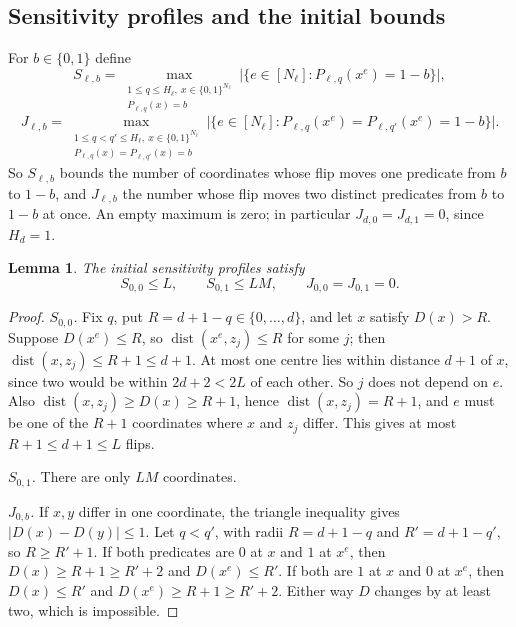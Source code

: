 \documentclass[11pt]{article}
\newtheorem{lemma}[theorem]{Lemma}
\theoremstyle{definition}
\theoremstyle{remark}
\begin{document}
\subsection{Sensitivity profiles and the initial bounds}
For \(b\in\{0,1\}\) define
\[
 S_{\ell,b}=\max_{\substack{1\le q\le H_\ell,\ x\in\{0,1\}^{N_\ell}\\
                           P_{\ell,q}(x)=b}}
 \bigl|\{e\in[N_\ell]:P_{\ell,q}(x^e)=1-b\}\bigr|,
\]
\[
 J_{\ell,b}=\max_{\substack{1\le q<q'\le H_\ell,\ x\in\{0,1\}^{N_\ell}\\
                         P_{\ell,q}(x)=P_{\ell,q'}(x)=b}}
 \bigl|\{e\in[N_\ell]:P_{\ell,q}(x^e)=P_{\ell,q'}(x^e)=1-b\}\bigr|.
\]
So $S_{\ell,b}$ bounds the number of coordinates whose flip moves one
predicate from $b$ to $1-b$, and $J_{\ell,b}$ the number whose flip moves two
distinct predicates from $b$ to $1-b$ at once. An empty maximum is zero; in
particular \(J_{d,0}=J_{d,1}=0\), since \(H_d=1\).

\begin{lemma}\label{lem:base}
The initial sensitivity profiles satisfy
\begin{equation}\label{eq:base-profile}
 S_{0,0}\le L,\qquad S_{0,1}\le LM,\qquad
 J_{0,0}=J_{0,1}=0.
\end{equation}
\end{lemma}
\begin{proof}
\emph{$S_{0,0}$.} Fix $q$, put \(R=d+1-q\in\{0,\ldots,d\}\), and let $x$
satisfy $D(x)>R$. Suppose $D(x^e)\le R$, so
$\operatorname{dist}(x^e,z_j)\le R$ for some $j$; then
$\operatorname{dist}(x,z_j)\le R+1\le d+1$. At most one centre lies within
distance \(d+1\) of \(x\), since two would be within \(2d+2<2L\) of each
other. So $j$ does not depend on $e$. Also
$\operatorname{dist}(x,z_j)\ge D(x)\ge R+1$, hence
$\operatorname{dist}(x,z_j)=R+1$, and $e$ must be one of the $R+1$ coordinates
where $x$ and $z_j$ differ. This gives at most \(R+1\le d+1\le L\) flips.

\emph{$S_{0,1}$.} There are only \(LM\) coordinates.

\emph{$J_{0,b}$.} If $x,y$ differ in one coordinate, the triangle inequality
gives \(|D(x)-D(y)|\le1\). Let $q<q'$, with radii $R=d+1-q$ and $R'=d+1-q'$,
so $R\ge R'+1$. If both predicates are $0$ at $x$ and $1$ at $x^e$, then
$D(x)\ge R+1\ge R'+2$ and $D(x^e)\le R'$. If both are $1$ at $x$ and $0$ at
$x^e$, then $D(x)\le R'$ and $D(x^e)\ge R+1\ge R'+2$. Either way $D$ changes
by at least two, which is impossible.
\end{proof}
\end{document}
